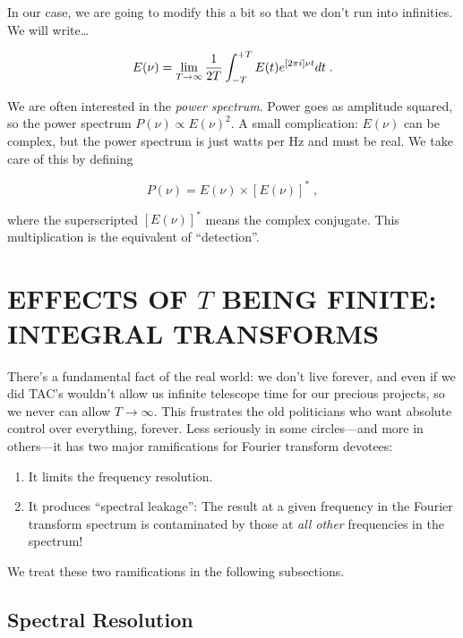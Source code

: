 \documentclass[preprint]{aastex}
\begin{document}
In our case, we are going to modify this a bit so that we don't run into
infinities. We will write\dots

\begin{equation} \label{eqtwo}
E(\nu) = \lim_{T \to \infty} {1 \over 2T}
\int_{-T}^{+T} E(t) e^{[2 \pi i]\nu t}  dt \; .
\end{equation}

\noindent We are often interested in the {\it power spectrum}.   Power
goes as amplitude squared, so the power spectrum $P(\nu ) \propto E(\nu
)^2$.  A small complication: $E(\nu)$ can be complex, but the power
spectrum is just watts per Hz and must be real.  We take care of this by
defining

\begin{equation}
P(\nu ) = E(\nu ) \times [E(\nu )]^* \; ,
\end{equation}

\noindent where the superscripted $[E(\nu)]^*$ means the complex
conjugate.  This multiplication is the equivalent of ``detection''. 

\section{EFFECTS OF $T$ BEING FINITE: INTEGRAL TRANSFORMS}

\label{sectiontwo}

	There's a fundamental fact of the real world: we don't live
forever, and even if we did TAC's wouldn't allow us infinite telescope
time for our precious projects, so we never can allow $T \rightarrow
\infty$.  This frustrates the old politicians who want absolute control
over everything, forever.  Less seriously in some circles---and more in
others---it has two major ramifications for Fourier transform devotees:
\begin{enumerate}

	\item It limits the frequency resolution.

	\item It produces ``spectral leakage'': The result at a given
frequency in the Fourier transform spectrum is contaminated by those at
{\it all other} frequencies in the spectrum!
\end{enumerate}

	We treat these two ramifications in the following subsections.

\subsection{Spectral Resolution} \label{spctres}
\end{document}
